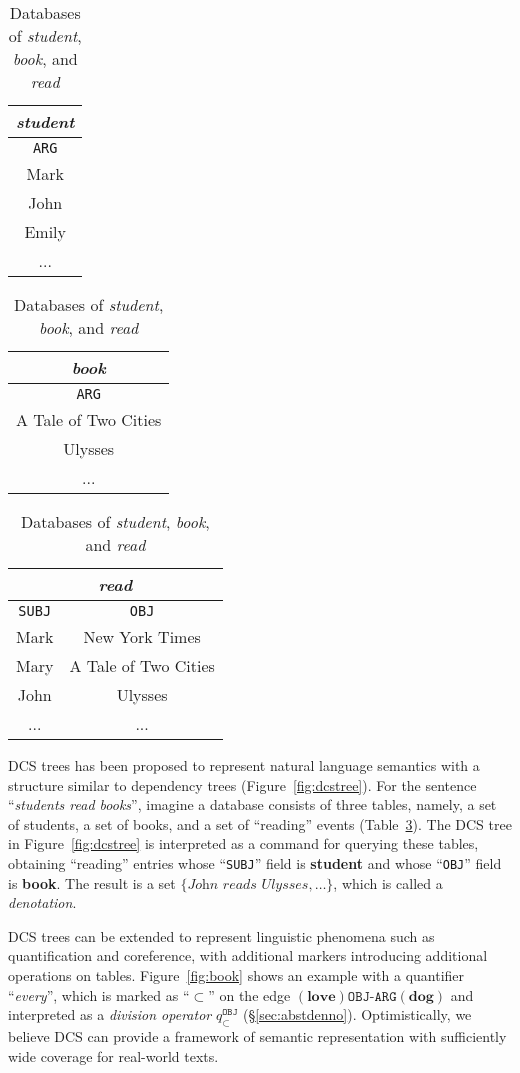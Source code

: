 \documentclass[11pt]{article}
\begin{document}
\begin{table}[t]
\centering
\scriptsize
\begin{tabular}{|c|}
\multicolumn{1}{c}{\emph{student}} \\
\hline
\texttt{ARG} \\
\hline
Mark \\
John \\
Emily \\
... \\
\hline
\end{tabular}
\begin{tabular}{|c|}
\multicolumn{1}{c}{\emph{book}} \\
\hline
\texttt{ARG} \\
\hline
A Tale of Two Cities \\
Ulysses \\
... \\
\hline
\end{tabular}
\begin{tabular}{| c | c |}
\multicolumn{2}{c}{\emph{read}} \\
\hline
\texttt{SUBJ} & \texttt{OBJ} \\
\hline
 Mark & New York Times \\
 Mary & A Tale of Two Cities \\
 John & Ulysses \\
 ... & ... \\
\hline
\end{tabular}
\caption{Databases of \emph{student}, \emph{book}, and \emph{read}}
\label{tab:readdb}
\end{table}

DCS trees has been proposed to 
represent natural language semantics with a structure similar to
dependency trees \cite{liang11} (Figure~\ref{fig:dcstree}). 
For the sentence ``\emph{students read books}'', imagine a 
database consists of three tables, namely, a set of students, a set 
of books, and a set of ``reading'' events (Table~\ref{tab:readdb}).
The DCS tree in Figure~\ref{fig:dcstree} is interpreted as a command 
for querying these tables, obtaining ``reading'' entries whose 
``\texttt{SUBJ}'' field is \textbf{student} and whose ``\texttt{OBJ}''
field is \textbf{book}.  The result is 
a set $\{\textit{John reads Ulysses},\ldots\}$, which is called a 
\emph{denotation}. 

DCS trees can be extended to represent
linguistic phenomena such as quantification and coreference, with additional markers 
introducing additional operations on tables.
Figure~\ref{fig:book} shows an example with a quantifier ``\emph{every}'', 
which is marked as ``$\subset$'' on
the edge $(\textbf{love})\texttt{OBJ-ARG}(\textbf{dog})$ and interpreted 
as a \emph{division operator} $q_{\subset}^{\texttt{OBJ}}$ (\S\ref{sec:abstdenno}). 
Optimistically, we believe DCS can provide a framework of semantic representation with
sufficiently wide coverage for real-world texts.
\end{document}
